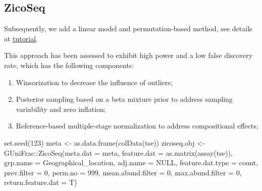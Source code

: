 \documentclass[
]{book}
\newenvironment{Shaded}{\begin{snugshade}}{\end{snugshade}}
\newcommand{\AttributeTok}[1]{\textcolor[rgb]{0.77,0.63,0.00}{#1}}
\newcommand{\ConstantTok}[1]{\textcolor[rgb]{0.00,0.00,0.00}{#1}}
\newcommand{\DecValTok}[1]{\textcolor[rgb]{0.00,0.00,0.81}{#1}}
\newcommand{\FunctionTok}[1]{\textcolor[rgb]{0.00,0.00,0.00}{#1}}
\newcommand{\NormalTok}[1]{#1}
\newcommand{\OtherTok}[1]{\textcolor[rgb]{0.56,0.35,0.01}{#1}}
\newcommand{\SpecialCharTok}[1]{\textcolor[rgb]{0.00,0.00,0.00}{#1}}
\newcommand{\StringTok}[1]{\textcolor[rgb]{0.31,0.60,0.02}{#1}}
\begin{document}
\hypertarget{zicoseq}{%
\subsection{ZicoSeq}\label{zicoseq}}

Subsequently, we add a linear model and permutation-based method, see
details at \href{https://cran.r-project.org/web/packages/GUniFrac/vignettes/ZicoSeq.html}{tutorial}.

This approach has been assessed to exhibit high power and a low false
discovery rate, which has the following components:

\begin{enumerate}
\def\labelenumi{\arabic{enumi}.}
\item
  Winsorization to decrease the influence of outliers;
\item
  Posterior sampling based on a beta mixture prior to address
  sampling variability and zero inflation;
\item
  Reference-based multiple-stage normalization to address
  compositional effects;
\end{enumerate}

\begin{Shaded}
\begin{Highlighting}[]
\FunctionTok{set.seed}\NormalTok{(}\DecValTok{123}\NormalTok{)}
\NormalTok{meta }\OtherTok{\textless{}{-}} \FunctionTok{as.data.frame}\NormalTok{(}\FunctionTok{colData}\NormalTok{(tse))}
\NormalTok{zicoseq.obj }\OtherTok{\textless{}{-}}\NormalTok{ GUniFrac}\SpecialCharTok{::}\FunctionTok{ZicoSeq}\NormalTok{(}\AttributeTok{meta.dat =}\NormalTok{ meta, }
                                 \AttributeTok{feature.dat =} \FunctionTok{as.matrix}\NormalTok{(}\FunctionTok{assay}\NormalTok{(tse)),}
                                 \AttributeTok{grp.name =} \StringTok{\textquotesingle{}Geographical\_location\textquotesingle{}}\NormalTok{,}
                                 \AttributeTok{adj.name =} \ConstantTok{NULL}\NormalTok{, }
                                 \AttributeTok{feature.dat.type =} \StringTok{\textquotesingle{}count\textquotesingle{}}\NormalTok{,}
                                 \AttributeTok{prev.filter =} \DecValTok{0}\NormalTok{,}
                                 \AttributeTok{perm.no =} \DecValTok{999}\NormalTok{,}
                                 \AttributeTok{mean.abund.filter =} \DecValTok{0}\NormalTok{,}
                                 \AttributeTok{max.abund.filter =} \DecValTok{0}\NormalTok{,}
                                 \AttributeTok{return.feature.dat =}\NormalTok{ T)}
\end{Highlighting}
\end{Shaded}
\end{document}
